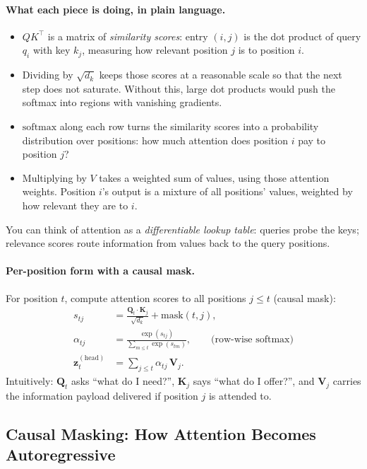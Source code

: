 \documentclass[11pt]{article}
\theoremstyle{remark}
\begin{document}
\paragraph{What each piece is doing, in plain language.}
\begin{itemize}[noitemsep]
    \item \(QK^{\top}\) is a matrix of \emph{similarity scores}: entry \((i,j)\) is the dot product of query \(q_i\) with key \(k_j\), measuring how relevant position \(j\) is to position \(i\).
    \item Dividing by \(\sqrt{d_k}\) keeps those scores at a reasonable scale so that the next step does not saturate. Without this, large dot products would push the softmax into regions with vanishing gradients.
    \item \(\mathrm{softmax}\) along each row turns the similarity scores into a probability distribution over positions: how much attention does position \(i\) pay to position \(j\)?
    \item Multiplying by \(V\) takes a weighted sum of values, using those attention weights. Position \(i\)'s output is a mixture of all positions' values, weighted by how relevant they are to \(i\).
\end{itemize}
You can think of attention as a \emph{differentiable lookup table}: queries probe the keys; relevance scores route information from values back to the query positions.

\paragraph{Per-position form with a causal mask.}
For position \(t\), compute attention scores to all positions \(j\le t\) (causal mask):
\begin{align}
s_{tj} &= \frac{\mathbf{Q}_t\cdot \mathbf{K}_j}{\sqrt{d_k}} + \text{mask}(t,j),\\
\alpha_{tj} &= \frac{\exp(s_{tj})}{\sum_{m\le t}\exp(s_{tm})},\qquad \text{(row-wise softmax)}\\
\mathbf{z}^{(\text{head})}_t &= \sum_{j\le t} \alpha_{tj}\,\mathbf{V}_j.
\end{align}
Intuitively: \(\mathbf{Q}_t\) asks ``what do I need?'', \(\mathbf{K}_j\) says ``what do I offer?'', and \(\mathbf{V}_j\) carries the information payload delivered if position \(j\) is attended to.

\subsection{Causal Masking: How Attention Becomes Autoregressive}
\end{document}
